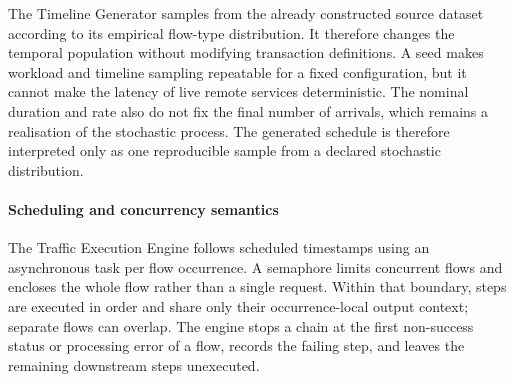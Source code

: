 \noindent The Timeline Generator samples from the already constructed source dataset according to
its empirical flow-type distribution. It therefore changes the temporal
population without modifying transaction definitions. A seed makes workload
and timeline sampling repeatable for a fixed configuration, but it
cannot make the latency of live remote services deterministic. The nominal
duration and rate also do not fix the final number of arrivals, which remains a
realisation of the stochastic process. The generated schedule is therefore
interpreted only as one reproducible sample from a declared stochastic distribution.

\paragraph{Scheduling and concurrency semantics}
\noindent The Traffic Execution Engine follows scheduled timestamps using an asynchronous task
per flow occurrence. A semaphore limits concurrent flows and encloses the whole
flow rather than a single request. Within that boundary, steps are executed in
order and share only their occurrence-local output context; separate flows can
overlap. The engine stops a chain at the first non-success status or processing
error of a flow, records the failing step, and leaves the remaining downstream steps
unexecuted.


